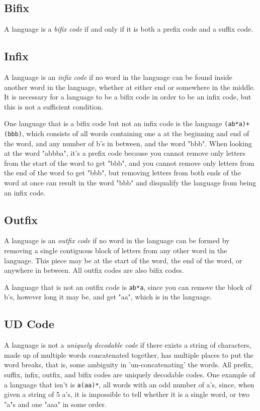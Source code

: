 \documentclass{article}
\begin{document}
\subsection{Bifix}
A language is a \textit{bifix code} if and only if it is both a prefix code and a suffix code.

\subsection{Infix}
A language is an \textit{infix code} if no word in the language can be found inside another word in the language, whether at either end or somewhere in the middle. It is necessary for a language to be a bifix code in order to be an infix code, but this is not a sufficient condition.

\par One language that is a bifix code but not an infix code is the language \verb-(ab*a)+(bbb)-, which consists of all words containing one a at the beginning and end of the word, and any number of b's in between, and the word "bbb".
When looking at the word "abbba", it's a prefix code because you cannot remove only letters from the start of the word to get "bbb", and you cannot remove only letters from the end of the word to get "bbb", but removing letters from both ends of the word at once can result in the word "bbb" and disqualify the language from being an infix code.

\subsection{Outfix}
A language is an \textit{outfix code} if no word in the language can be formed by removing a single contiguous block of letters from any other word in the language. This piece may be at the start of the word, the end of the word, or anywhere in between. All outfix codes are also bifix codes.
\par A language that is not an outfix code is \verb-ab*a-, since you can remove the block of b's, however long it may be, and get "aa", which is in the language.

\subsection{UD Code}
A language is not a \textit{uniquely decodable code} if there exists a string of characters, made up of multiple words concatenated together, has multiple places to put the word breaks, that is, some ambiguity in 'un-concatenating' the words. All prefix, suffix, infix, outfix, and bifix codes are uniquely decodable codes. One example of a language that isn't is \verb-a(aa)*-, all words with an odd number of a's, since, when given a string of 5 a's, it is impossible to tell whether it is a single word, or two "a"s and one "aaa" in some order.
\end{document}
